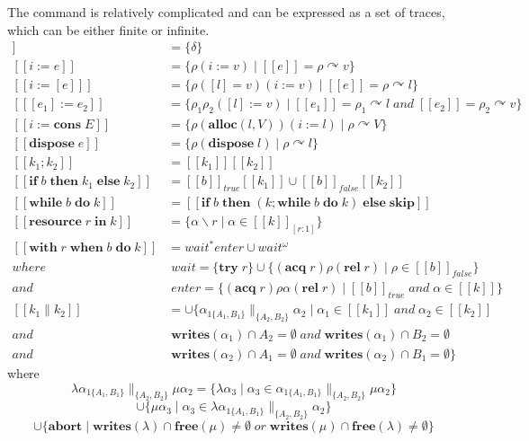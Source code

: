\documentclass{lmcs} %
\theoremstyle{plain}\newtheorem{satz}[thm]{Satz} %
\begin{document}
The command is relatively complicated and can be expressed as a set of traces, which can be either finite or infinite.
\begin{align*}
  [\![\mathbf{skip}]\!]&=\{\delta\}\\
  [\![i:=e]\!]&=\{\rho(i:=v)\mid[\![e]\!]=\rho\curvearrowright v\}\\
  [\![i:=[e]]\!]&=\{\rho([l]=v)(i:=v)\mid [\![e]\!]=\rho\curvearrowright l\}\\
  [\![[e_1]:=e_2]\!]&=\{\rho_1\rho_2([l]:=v)\mid [\![e_1]\!]=\rho_1\curvearrowright l\;and\;[\![e_2]\!]=\rho_2\curvearrowright v\}\\
  [\![i:=\mathbf{cons}\;E]\!]&=\{\rho(\mathbf{alloc}(l,V))(i:=l)\mid \rho\curvearrowright V\} \\
  [\![\mathbf{dispose}\;e]\!]&=\{\rho(\mathbf{dispose}\;l)\mid \rho\curvearrowright l\}\\
  [\![k_1;k_2]\!]&=[\![k_1]\!][\![k_2]\!]\\
  [\![\mathbf{if}\;b\;\mathbf{then}\;k_1\;\mathbf{else}\;k_2]\!]&=[\![b]\!]_{true}[\![k_1]\!]\cup[\![b]\!]_{false}[\![k_2]\!]\\
  [\![\mathbf{while}\;b\;\mathbf{do}\;k]\!]&=[\![\mathbf{if}\;b\;\mathbf{then}\;(k;\mathbf{while}\;b\;\mathbf{do}\;k)\;\mathbf{else}\;\mathbf{skip}]\!]\\
  [\![\mathbf{resource}\;r\;\mathbf{in}\;k]\!]&=\{\alpha\backslash r\mid \alpha\in [\![k]\!]_{[r:1]}\}\\
  [\![\mathbf{with}\;r\;\mathbf{when}\;b\;\mathbf{do}\;k]\!]&=wait^*enter\cup wait^\omega\\
  where&\;wait=\{\mathbf{try}\;r\}\cup\{(\mathbf{acq}\;r)\rho(\mathbf{rel}\;r)\mid \rho\in [\![b]\!]_{false}\}\\
  and  &\;enter=\{(\mathbf{acq}\;r)\rho\alpha(\mathbf{rel}\;r)\mid [\![b]\!]_{true}\; and\; \alpha\in[\![k]\!]\}\\
  [\![k_1\|k_2]\!]&=\cup\{\alpha_{1\{A_1,B_1\}}\|_{\{A_2,B_2\}}\alpha_2\mid \alpha_1\in [\![k_1]\!]\;and\; \alpha_2\in [\![k_2]\!]\\
  and & \;\mathbf{writes}(\alpha_1)\cap A_2 =\emptyset\;and\;\mathbf{writes}(\alpha_1)\cap B_2 =\emptyset\\
  and & \;\mathbf{writes}(\alpha_2)\cap A_1 =\emptyset\;and\;\mathbf{writes}(\alpha_2)\cap B_1 =\emptyset\}
\end{align*}
where
$$\lambda\alpha_{1\{A_1,B_1\}}\|_{\{A_2,B_2\}}\mu\alpha_2=\{\lambda\alpha_3\mid \alpha_3\in \alpha_{1\{A_1,B_1\}}\|_{\{A_2,B_2\}}\mu\alpha_2\}$$
$$\cup\{\mu\alpha_3\mid \alpha_3\in \lambda\alpha_{1\{A_1,B_1\}}\|_{\{A_2,B_2\}}\alpha_2\}$$
$$\cup\{\mathbf{abort}\mid \mathbf{writes}(\lambda)\cap \mathbf{free}(\mu)\neq\emptyset\;
or\;\mathbf{writes}(\mu)\cap \mathbf{free}(\lambda)\neq\emptyset\}$$
\end{document}
